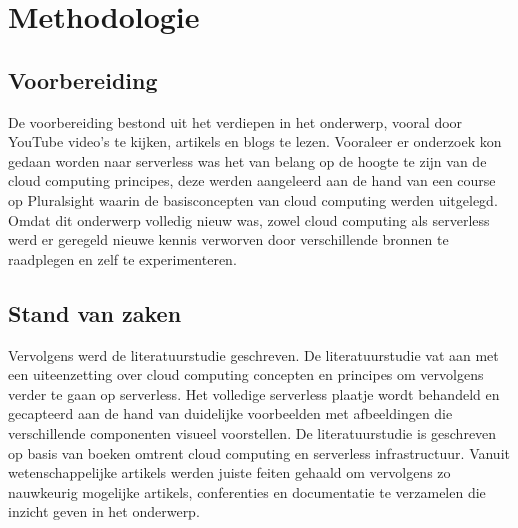
\chapter{Methodologie}
\label{ch:methodologie}


\section{Voorbereiding}
De voorbereiding bestond uit het verdiepen in het onderwerp, vooral door YouTube video's te kijken, artikels en blogs te lezen. Vooraleer er onderzoek kon gedaan worden naar serverless was het van belang op de hoogte te zijn van de cloud computing principes, deze werden aangeleerd aan de hand van een course op Pluralsight waarin de basisconcepten van cloud computing werden uitgelegd. Omdat dit onderwerp volledig nieuw was, zowel cloud computing als serverless werd er geregeld nieuwe kennis verworven door verschillende bronnen te raadplegen en zelf te experimenteren.

\section{Stand van zaken}
Vervolgens werd de literatuurstudie geschreven. De literatuurstudie vat aan met een uiteenzetting over cloud computing concepten en principes om vervolgens verder te gaan op serverless. Het volledige serverless plaatje wordt behandeld en gecapteerd aan de hand van duidelijke voorbeelden met afbeeldingen die verschillende componenten visueel voorstellen. De literatuurstudie is geschreven op basis van boeken omtrent cloud computing en serverless infrastructuur. Vanuit wetenschappelijke artikels werden juiste feiten gehaald om vervolgens zo nauwkeurig mogelijke artikels, conferenties en documentatie te verzamelen die inzicht geven in het onderwerp.

